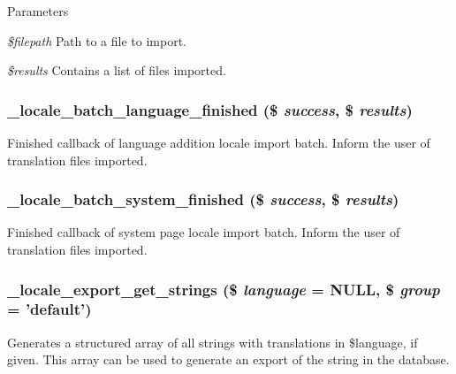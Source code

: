 \begin{DoxyParams}{Parameters}
\item[{\em \$filepath}]Path to a file to import. \item[{\em \$results}]Contains a list of files imported. \end{DoxyParams}
\hypertarget{group__locale_ga06bd6310727083246869907515bea547}{
\subsubsection[{\_\-locale\_\-batch\_\-language\_\-finished}]{\setlength{\rightskip}{0pt plus 5cm}\_\-locale\_\-batch\_\-language\_\-finished (\$ {\em success}, \/  \$ {\em results})}}
\label{group__locale_ga06bd6310727083246869907515bea547}
Finished callback of language addition locale import batch. Inform the user of translation files imported. \hypertarget{group__locale_ga3b7cc14a5735d2aee066dd4f6bb517b8}{
\subsubsection[{\_\-locale\_\-batch\_\-system\_\-finished}]{\setlength{\rightskip}{0pt plus 5cm}\_\-locale\_\-batch\_\-system\_\-finished (\$ {\em success}, \/  \$ {\em results})}}
\label{group__locale_ga3b7cc14a5735d2aee066dd4f6bb517b8}
Finished callback of system page locale import batch. Inform the user of translation files imported. \hypertarget{group__locale_gade17be27a5240ba4804dc51eccf40246}{
\subsubsection[{\_\-locale\_\-export\_\-get\_\-strings}]{\setlength{\rightskip}{0pt plus 5cm}\_\-locale\_\-export\_\-get\_\-strings (\$ {\em language} = {\ttfamily NULL}, \/  \$ {\em group} = {\ttfamily 'default'})}}
\label{group__locale_gade17be27a5240ba4804dc51eccf40246}
Generates a structured array of all strings with translations in \$language, if given. This array can be used to generate an export of the string in the database.


